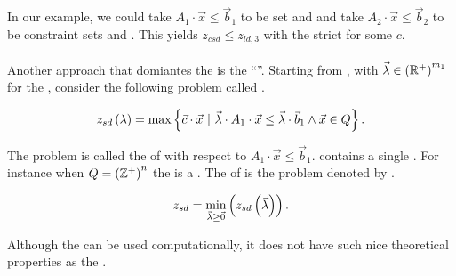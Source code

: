 In our example, we could take $A_1\cdot\vec{x}\leq\vec{b}_1$ to be  set  and  and take $A_2\cdot\vec{x}\leq\vec{b}_2$ to be constraint sets  and . This yields $z_{csd}\leq z_{ld,3}$ with the  strict for some  $c$.

\paragraph{}
Another approach that domiantes the  is the ``''. Starting from , with  $\vec{\lambda}\in\left( \mathbb{R}^+ \right)^{m_1}$ for the , consider the following problem called .

\begin{equation}
z_{sd}\left( \lambda \right)=\max\left\{ \vec{c}\cdot\vec{x}\ |\ \vec{\lambda}\cdot A_1\cdot\vec{x}\leq\vec{\lambda}\cdot\vec{b}_1\wedge\vec{x}\in Q \right\}.
\end{equation}

The problem  is called the  of  with respect to $A_1\cdot\vec{x}\leq\vec{b}_1$.  contains a single . For instance when $Q=\left( \mathbb{Z}^+ \right)^n$ the  is a . The  of  is the problem denoted by .

\begin{equation}
z_{sd}=\min_{\vec{\lambda}\geq\vec{0}}\left( z_{sd}\left( \vec{\lambda} \right) \right).
\end{equation}

Although the  can be used computationally, it does not have such nice theoretical properties as the .

